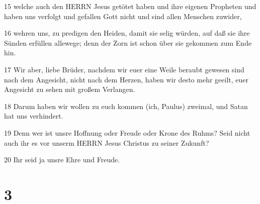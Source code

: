 \par 15 welche auch den HERRN Jesus getötet haben und ihre eigenen Propheten und haben uns verfolgt und gefallen Gott nicht und sind allen Menschen zuwider,
\par 16 wehren uns, zu predigen den Heiden, damit sie selig würden, auf daß sie ihre Sünden erfüllen allewege; denn der Zorn ist schon über sie gekommen zum Ende hin.
\par 17 Wir aber, liebe Brüder, nachdem wir euer eine Weile beraubt gewesen sind nach dem Angesicht, nicht nach dem Herzen, haben wir desto mehr geeilt, euer Angesicht zu sehen mit großem Verlangen.
\par 18 Darum haben wir wollen zu euch kommen (ich, Paulus) zweimal, und Satan hat uns verhindert.
\par 19 Denn wer ist unsre Hoffnung oder Freude oder Krone des Ruhms? Seid nicht auch ihr es vor unserm HERRN Jesus Christus zu seiner Zukunft?
\par 20 Ihr seid ja unsre Ehre und Freude.

\chapter{3}

